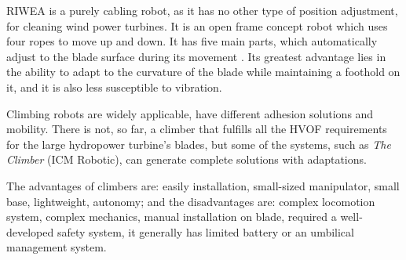 RIWEA is a purely cabling robot, as it has no other type of position
adjustment, for cleaning wind power turbines. It is an open frame concept robot
which uses four ropes to move up and down. It has five main parts, which
automatically adjust to the blade surface during its movement
\citep{jeon2012maintenance}. Its greatest advantage lies in the ability to adapt
to the curvature of the blade while maintaining a foothold on it, and it is also
less susceptible to vibration.

Climbing robots are widely applicable, have different adhesion solutions and
mobility. There is not, so far, a climber that fulfills all the HVOF
requirements for the large hydropower turbine's blades, but some of the
systems, such as \textit{The Climber} (ICM Robotic), can generate complete
solutions with adaptations.

The advantages of climbers are: easily installation, small-sized
manipulator, small base, lightweight, autonomy; and the disadvantages are:
complex locomotion system, complex mechanics, manual installation on blade,
required a well-developed safety system, it generally has limited battery or
an umbilical management system. 
